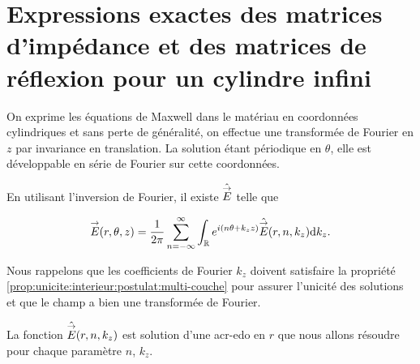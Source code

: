 \section[Opérateur de Calderón pour un cylindre infini]{Expressions exactes des matrices d'impédance et des matrices de réflexion pour un cylindre infini}


  \begin{figure}[!hbt]
    \centering
    \begin{tikzpicture}
      
    \end{tikzpicture}
  \end{figure}

  On exprime les équations de Maxwell dans le matériau en coordonnées cylindriques et sans perte de généralité, on effectue une transformée de Fourier en \(z\) par invariance en translation.
  La solution étant périodique en \(\theta\), elle est développable en série de Fourier sur cette coordonnées.

  En utilisant l'inversion de Fourier, il existe \(\hat\vE\) telle que

  \begin{equation*}
    \vE(r,\theta,z) = \frac{1}{2\pi}\sum_{n=-\infty}^{\infty}\int_{\RR} e^{i(n \theta + k_z z )}\hat{\vE} (r,n,k_z) \dd{k_z}.
  \end{equation*}

  Nous rappelons que les coefficients de Fourier \(k_z\) doivent satisfaire la propriété \ref{prop:unicite:interieur:postulat:multi-couche} pour assurer l'unicité des solutions et que le champ a bien une transformée de Fourier.

  La fonction \(\hat{\vE} (r,n,k_z)\) est solution d'une \gls{acr-edo} en \(r\) que nous allons résoudre pour chaque paramètre \(n\), \(k_z\).

